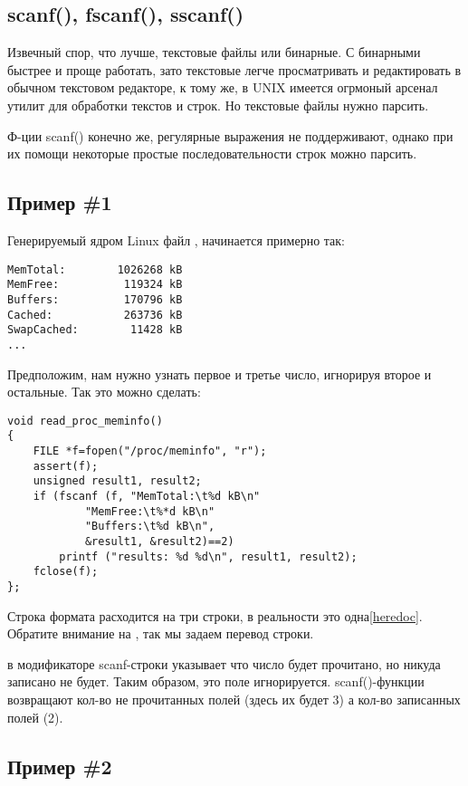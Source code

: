 ﻿\subsection{scanf(), fscanf(), sscanf()}

Извечный спор, что лучше, текстовые файлы или бинарные. С бинарными быстрее и проще работать, зато текстовые
легче просматривать и редактировать в обычном текстовом редакторе, к тому же, в UNIX имеется огрмоный арсенал
утилит для обработки текстов и строк. Но текстовые файлы нужно парсить.

Ф-ции scanf()\cite[7.19.6.2]{C99TC3} конечно же, регулярные выражения не поддерживают, 
однако при их помощи некоторые простые последовательности строк можно парсить. 

\subsection{Пример \#1}

Генерируемый ядром Linux файл , начинается примерно так:

\begin{lstlisting}
MemTotal:        1026268 kB
MemFree:          119324 kB
Buffers:          170796 kB
Cached:           263736 kB
SwapCached:        11428 kB
...
\end{lstlisting}

Предположим, нам нужно узнать первое и третье число, игнорируя второе и остальные.
Так это можно сделать:

\begin{lstlisting}
void read_proc_meminfo()
{
	FILE *f=fopen("/proc/meminfo", "r");
	assert(f);
	unsigned result1, result2;
	if (fscanf (f, "MemTotal:\t%d kB\n"
			"MemFree:\t%*d kB\n"
			"Buffers:\t%d kB\n", 
			&result1, &result2)==2)
		printf ("results: %d %d\n", result1, result2);
	fclose(f);
};
\end{lstlisting}

Строка формата расходится на три строки, в реальности это одна\ref{heredoc}.
Обратите внимание на , так мы задаем перевод строки.

\TT{*} в модификаторе scanf-строки указывает что число будет прочитано, но никуда записано не будет.
Таким образом, это поле игнорируется. scanf()-функции возвращают кол-во не прочитанных полей (здесь
их будет 3) а кол-во записанных полей (2).

\subsection{Пример \#2}

